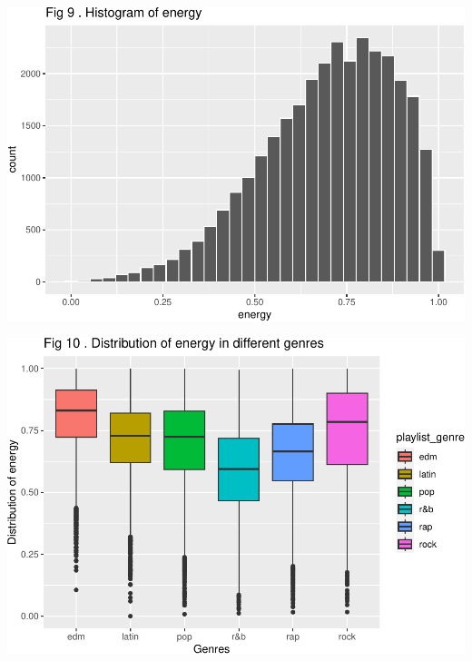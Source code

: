 \documentclass[
]{article}
\begin{document}
\includegraphics{Final-Report_files/figure-latex/unnamed-chunk-14-5.pdf}

\includegraphics{Final-Report_files/figure-latex/unnamed-chunk-14-6.pdf}
\end{document}
